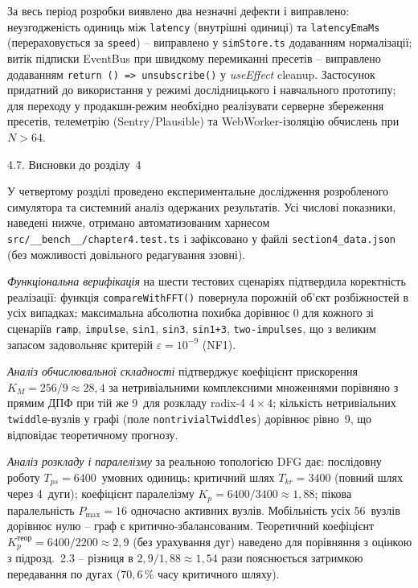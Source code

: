 \documentclass[
]{article}
\begin{document}
За весь період розробки виявлено два незначні дефекти і виправлено:
неузгодженість одиниць між \texttt{latency} (внутрішні одиниці) та
\texttt{latencyEmaMs} (перераховується за \texttt{speed}) -- виправлено у
\texttt{simStore.ts} додаванням нормалізації; витік підписки EventBus
при швидкому перемиканні пресетів -- виправлено додаванням
\texttt{return}~\texttt{()}~\texttt{=\textgreater{}}~\texttt{unsubscribe()}
у \emph{useEffect} cleanup. Застосунок придатний до використання у
режимі дослідницького і навчального прототипу; для переходу у
продакшн-режим необхідно реалізувати серверне збереження пресетів,
телеметрію (Sentry/Plausible) та WebWorker-ізоляцію обчислень при
\(N > 64\).

\protect{}\label{ux432ux438ux441ux43dux43eux432ux43aux438-ux434ux43e-ux440ux43eux437ux434ux456ux43bux443-4}{}4.7.
Висновки до розділу~4

У четвертому розділі проведено експериментальне дослідження розробленого
симулятора та системний аналіз одержаних результатів. Усі числові
показники, наведені нижче, отримано автоматизованим харнесом
\texttt{src}\texttt{/\_\_bench\_\_/}\texttt{chapter4.test.ts} і
зафіксовано у файлі \texttt{section4\_data.json} (без можливості
довільного редагування ззовні).

\emph{Функціональна верифікація} на шести тестових сценаріях підтвердила
коректність реалізації: функція \texttt{compareWithFFT}\texttt{()}
повернула порожній об'єкт розбіжностей в усіх випадках; максимальна
абсолютна похибка дорівнює \(0\) для кожного зі сценаріїв
\texttt{ramp}, \texttt{impulse}, \texttt{sin1}, \texttt{sin3},
\texttt{sin1+3}, \texttt{two-impulses}, що з великим запасом
задовольняє критерій \(\varepsilon = 10^{- 9}\) (NF1).

\emph{Аналіз обчислювальної складності} підтверджує коефіцієнт
прискорення \(K_{M} = 256/9 \approx 28{,}4\) за нетривіальними
комплексними множеннями порівняно з прямим ДПФ при тій же 9~для
розкладу radix-4 \(4 \times 4\); кількість нетривіальних
\texttt{twiddle}-вузлів у графі (поле \texttt{nontrivialTwiddles})
дорівнює рівно~9, що відповідає теоретичному прогнозу.

\emph{Аналіз розкладу і паралелізму} за реальною топологією DFG дає:
послідовну роботу \(T_{ps} = 6400\)~умовних одиниць; критичний шлях
\(T_{kr} = 3400\) (повний шлях через 4~дуги); коефіцієнт паралелізму
\(K_{p} = 6400/3400 \approx 1{,}88\); пікова паралельність
\(P_{\max} = 16\) одночасно активних вузлів. Мобільність усіх 56~вузлів
дорівнює нулю -- граф є критично-збалансованим. Теоретичний коефіцієнт
\(K_{p}^{\text{теор}} = 6400/2200 \approx 2{,}9\) (без урахування дуг)
наведено для порівняння з оцінкою з підрозд.~2.3 -- різниця в
\(2{,}9 / 1{,}88 \approx 1{,}54\) рази пояснюється затримкою передавання
по дугах (\(70{,}6\,\%\) часу критичного шляху).
\end{document}
